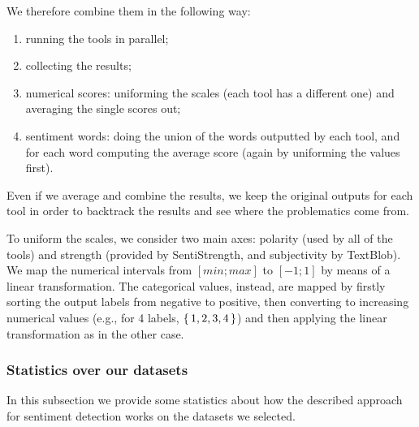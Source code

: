 We therefore combine them in the following way:
\begin{enumerate}
    \item running the tools in parallel;
    \item collecting the results;
    \item numerical scores: uniforming the scales (each tool has a different one) and averaging the single scores out;
    \item sentiment words: doing the union of the words outputted by each tool, and for each word computing the average score (again by uniforming the values first).
\end{enumerate}



Even if we average and combine the results, we keep the original outputs for each tool in order to backtrack the results and see where the problematics come from.

To uniform the scales, we consider two main axes: polarity (used by all of the tools) and strength (provided by SentiStrength, and subjectivity by TextBlob). We map the numerical intervals from $[min;max]$ to $[-1;1]$ by means of a linear transformation. The categorical values, instead, are mapped by firstly sorting the output labels from negative to positive, then converting to increasing numerical values (e.g., for 4 labels, $\set{1,2,3,4}$) and then applying the linear transformation as in the other case.

\subsubsection{\statusred Statistics over our datasets}

In this subsection we provide some statistics about how the described approach for sentiment detection works on the datasets we selected.

